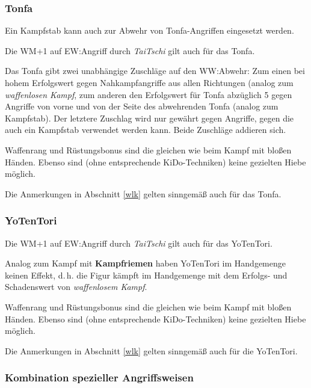 \documentclass[10pt,a4paper,germanpar]{article}
\begin{document}
\subsubsection{Tonfa}

Ein Kampfstab kann auch zur Abwehr von Tonfa-Angriffen eingesetzt
werden.

Die WM+1 auf EW:Angriff durch \emph{TaiTschi} gilt auch für das Tonfa.

Das Tonfa gibt zwei unabhängige Zuschläge auf den WW:Abwehr: Zum einen
bei hohem Erfolgswert gegen Nahkampfangriffe aus allen Richtungen
(analog zum \emph{waffenlosen Kampf}, zum anderen den Erfolgswert für
Tonfa abzüglich 5 gegen Angriffe von vorne und von der Seite des
abwehrenden Tonfa (analog zum Kampfstab). Der letztere Zuschlag wird
nur gewährt gegen Angriffe, gegen die auch ein Kampfstab verwendet
werden kann. Beide Zuschläge addieren sich.

Waffenrang und Rüstungsbonus sind die gleichen wie beim Kampf mit
bloßen Händen. Ebenso sind (ohne entsprechende KiDo-Techniken) keine
gezielten Hiebe möglich.

Die Anmerkungen in Abschnitt \ref{wlk} gelten sinngemäß auch für das
Tonfa.

\subsubsection{YoTenTori}
\label{yotentori}

Die WM+1 auf EW:Angriff durch \emph{TaiTschi} gilt auch für das YoTenTori.

Analog zum Kampf mit \textbf{Kampfriemen} haben YoTenTori im
Handgemenge keinen Effekt, d.\,h. die Figur kämpft im Handgemenge mit
dem Erfolgs- und Schadenswert von \emph{waffenlosem Kampf}.

Waffenrang und Rüstungsbonus sind die gleichen wie beim Kampf mit
bloßen Händen. Ebenso sind (ohne entsprechende KiDo-Techniken) keine
gezielten Hiebe möglich.

Die Anmerkungen in Abschnitt \ref{wlk} gelten sinngemäß auch für die
YoTenTori.

\subsubsection{Kombination spezieller Angriffsweisen}
\label{kombi}

\end{document}
